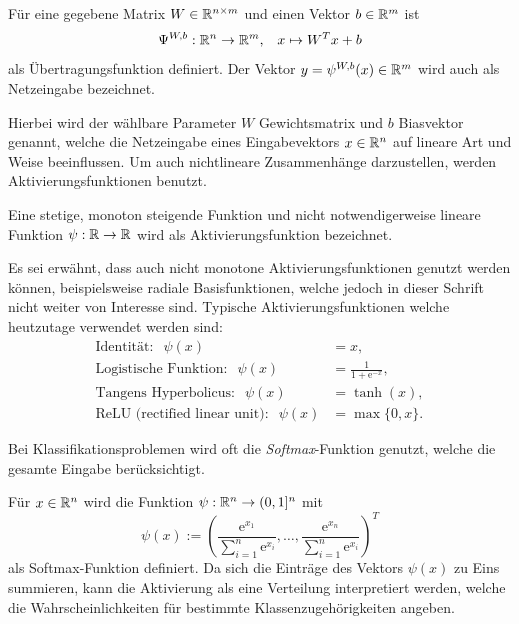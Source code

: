 \begin{defi}[Übertragungsfunktion]
    \label{def_net}
    Für eine gegebene Matrix $W \in \mathbb{R}^{n \times m}$ und einen Vektor $b \in \mathbb{R}^m$ ist 
    \[ 
    \Psi^{W,b}: \mathbb{R}^n \rightarrow \mathbb{R}^m, \; \; \; x \mapsto W^T x +b
    \]
    als Übertragungsfunktion definiert. Der Vektor $y=\psi^{W,b}(x) \in \mathbb{R}^m $ wird auch als Netzeingabe bezeichnet.
\end{defi}
Hierbei wird der wählbare Parameter $W$ Gewichtsmatrix und $b$ Biasvektor genannt, welche die Netzeingabe eines Eingabevektors $x \in \mathbb{R}^n$ auf lineare Art und Weise beeinflussen. Um auch nichtlineare Zusammenhänge darzustellen, werden Aktivierungsfunktionen benutzt.

\begin{defi}[Aktivierungsfunktion]
    \label{def_act_f}
    Eine stetige, monoton steigende Funktion und nicht notwendigerweise lineare Funktion $\psi: \mathbb{R} \rightarrow \mathbb{R}$ wird als Aktivierungsfunktion bezeichnet.
\end{defi}
Es sei erwähnt, dass auch nicht monotone Aktivierungsfunktionen genutzt werden können, beispielsweise radiale Basisfunktionen\cite{radialbasis}, welche jedoch in dieser Schrift nicht weiter von Interesse sind.
Typische Aktivierungsfunktionen welche heutzutage verwendet werden sind:
\begin{align*}
    \text{Identität}: \; \;\psi(x)&=x, \\
    \text{Logistische Funktion}: \; \;\psi(x)&=\frac{1}{1+\mathrm{e}^{-x}}, \\
    \text{Tangens Hyperbolicus}: \; \;\psi(x)&=\tanh(x), \\
    \text{ReLU (rectified linear unit)}: \; \;\psi(x)&=\max\{0,x\}.
\end{align*}

Bei Klassifikationsproblemen wird oft die \textit{Softmax}-Funktion\cite{denker1990transforming} genutzt, welche die gesamte Eingabe berücksichtigt. 

\begin{defi}[Softmax]
    Für $x \in \mathbb{R}^n$ wird die Funktion $\psi: \mathbb{R}^n \rightarrow (0,1]^n$ mit 
    \[
        \psi(x):=\left(\frac{\mathrm{e}^{x_1}}{\sum_{i=1}^n \mathrm{e}^{x_i}}, \ldots,\frac{\mathrm{e}^{x_n}}{\sum_{i=1}^n \mathrm{e}^{x_i}} \right)^T
    \]
    als Softmax-Funktion definiert. Da sich die Einträge des Vektors $\psi(x)$ zu Eins summieren, kann die Aktivierung als eine Verteilung interpretiert werden, welche die Wahrscheinlichkeiten für bestimmte Klassenzugehörigkeiten angeben.  
\end{defi}

